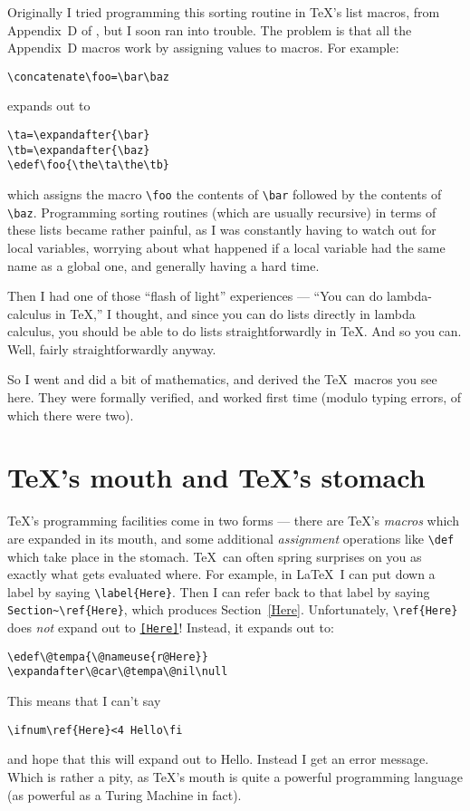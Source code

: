 Originally I tried programming this sorting routine in \TeX's
list macros, from Appendix~D of \TB, but I soon ran into trouble.
The problem is that all the Appendix~D macros work by assigning
values to macros.  For example:
\begin{verbatim}
\concatenate\foo=\bar\baz
\end{verbatim}
expands out to
\begin{verbatim}
\ta=\expandafter{\bar}
\tb=\expandafter{\baz}
\edef\foo{\the\ta\the\tb}
\end{verbatim}
which assigns the macro \verb|\foo| the contents of \verb|\bar|
followed by the contents of \verb|\baz|.  Programming sorting routines
(which are usually recursive) in terms of these lists became rather
painful, as I was constantly having to watch out for local variables,
worrying about what happened if a local variable had the same name
as a global one, and generally having a hard time.

Then I had one of those ``flash of light'' experiences ---
``You can do lambda-calculus in \TeX,'' I thought,
and since you can do lists directly in lambda calculus, 
you should be able to do lists straightforwardly in \TeX.  And so you
can.  Well, fairly straightforwardly anyway.

So I went and did a bit of mathematics, and derived the \TeX\ macros
you see here.  They were formally verified, and worked first time
(modulo typing errors, of which there were two).

\section{\TeX's mouth and \TeX's stomach}

\TeX's programming facilities come in two forms --- there are \TeX's
{\em macros\/} which are expanded in its mouth, and some additional 
{\em assignment\/} operations like \verb|\def| which take place in the
stomach.  \TeX\ can often spring surprises on you as exactly what
gets evaluated where.
For example, in \LaTeX\ I can put down a
label by saying \verb|\label{Here}|.
\label{Here}
Then I can refer back to that label by saying
\verb|Section~\ref{Here}|, which
produces Section~\ref{Here}.  Unfortunately, \verb|\ref{Here}| does
{\em not\/} expand out to {\tt\ref{Here}}!  Instead, it expands out to:
\begin{verbatim}
\edef\@tempa{\@nameuse{r@Here}}
\expandafter\@car\@tempa\@nil\null
\end{verbatim}
This means that I can't say 
\begin{verbatim}
\ifnum\ref{Here}<4 Hello\fi
\end{verbatim} 
and hope that this will expand out to Hello.  Instead I 
get an error message.  Which is rather a pity, as \TeX's mouth is
quite a powerful programming language (as powerful as a Turing Machine in
fact).  

